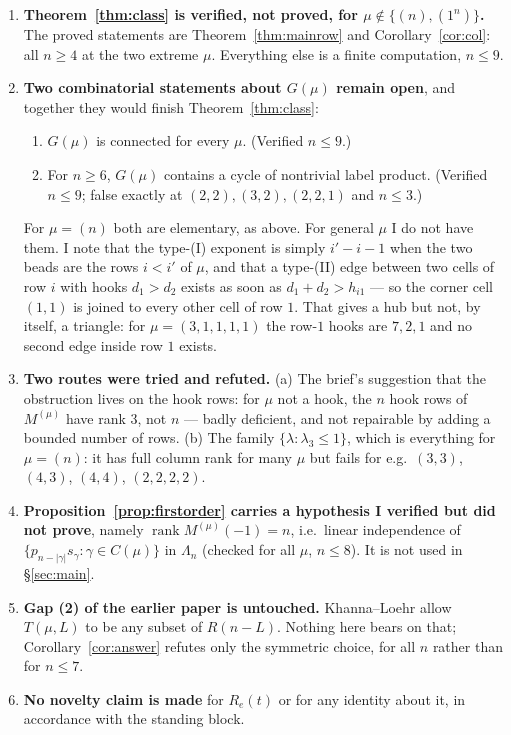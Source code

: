 \documentclass[11pt]{article}
\theoremstyle{definition}
\newcommand{\Lam}{\Lambda}
\begin{document}
\begin{enumerate}
\item \textbf{Theorem~\ref{thm:class} is verified, not proved, for $\mu\notin\{(n),(1^n)\}$.}
The proved statements are Theorem~\ref{thm:mainrow} and Corollary~\ref{cor:col}: all $n\ge4$
at the two extreme $\mu$. Everything else is a finite computation, $n\le9$.

\item \textbf{Two combinatorial statements about $G(\mu)$ remain open}, and together they
would finish Theorem~\ref{thm:class}:
\begin{enumerate}
\item[(G1)] $G(\mu)$ is connected for every $\mu$. (Verified $n\le9$.)
\item[(G2)] For $n\ge6$, $G(\mu)$ contains a cycle of nontrivial label product.
(Verified $n\le9$; false exactly at $(2,2),(3,2),(2,2,1)$ and $n\le3$.)
\end{enumerate}
For $\mu=(n)$ both are elementary, as above. For general $\mu$ I do not have them. I note
that the type-(I) exponent is simply $i'-i-1$ when the two beads are the rows $i<i'$ of
$\mu$, and that a type-(II) edge between two cells of row $i$ with hooks $d_1>d_2$ exists as
soon as $d_1+d_2>h_{i1}$ --- so the corner cell $(1,1)$ is joined to every other cell of row
$1$. That gives a hub but not, by itself, a triangle: for $\mu=(3,1,1,1,1)$ the row-$1$ hooks
are $7,2,1$ and no second edge inside row $1$ exists.

\item \textbf{Two routes were tried and refuted.} (a) The brief's suggestion that the
obstruction lives on the hook rows: for $\mu$ not a hook, the $n$ hook rows of $M^{(\mu)}$
have rank $3$, not $n$ --- badly deficient, and not repairable by adding a bounded number of
rows. (b) The family $\{\lambda:\lambda_3\le1\}$, which is everything for $\mu=(n)$: it has
full column rank for many $\mu$ but fails for e.g.\ $(3,3)$, $(4,3)$, $(4,4)$, $(2,2,2,2)$.

\item \textbf{Proposition~\ref{prop:firstorder} carries a hypothesis I verified but did not
prove}, namely $\operatorname{rank}M^{(\mu)}(-1)=n$, i.e.\ linear independence of
$\{p_{n-|\gamma|}s_\gamma:\gamma\in C(\mu)\}$ in $\Lam_n$ (checked for all $\mu$, $n\le8$).
It is not used in \S\ref{sec:main}.

\item \textbf{Gap (2) of the earlier paper is untouched.} Khanna--Loehr allow $T(\mu,L)$ to
be any subset of $R(n-L)$. Nothing here bears on that; Corollary~\ref{cor:answer} refutes
only the symmetric choice, for all $n$ rather than for $n\le7$.

\item \textbf{No novelty claim is made} for $R_e(t)$ or for any identity about it, in
accordance with the standing block.
\end{enumerate}
\end{document}
